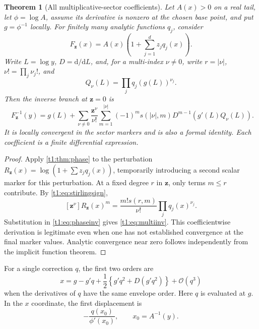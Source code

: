 \documentclass[11pt,openany]{book}
\numberwithin{equation}{chapter}
\theoremstyle{plain}
\newtheorem{theorem}{Theorem}[chapter]
\theoremstyle{definition}
\theoremstyle{remark}
\newcommand{\ddn}{\mathrm d}                  %
\newcommand{\OO}{\mathcal O}\newcommand{\bigO}{\mathcal O}
\newcommand{\coefA}[1]{\left[#1\right]}       %
\begin{document}
\begin{theorem}[All multiplicative-sector coefficients]
\label{t1:thm:multi}
Let $A(x)>0$ on a real tail, let $\phi=\log A$, assume its derivative is nonzero at the chosen base point, and put $g=\phi^{-1}$ locally. For finitely many analytic functions $q_j$, consider
\begin{equation}
 F_{\bm z}(x)=A(x)\left(1+\sum_{j=1}^d z_jq_j(x)\right).
 \label{t1:eq:multifamily}
\end{equation}
Write $L=\log y$, $D=\ddn/\ddn L$, and, for a multi-index $\nu\ne0$, write $r=|\nu|$, $\nu!=\prod_j\nu_j!$, and
\[
 Q_\nu(L)=\prod_j q_j(g(L))^{\nu_j}.
\]
Then the inverse branch at $\bm z=0$ is
\begin{equation}
 \boxed{\quad
 F_{\bm z}^{-1}(y)=g(L)+
 \sum_{\nu\ne0}\frac{\bm z^\nu}{\nu!}
 \sum_{m=1}^{|\nu|}(-1)^m s(|\nu|,m)
 D^{m-1}\!\left(g'(L)Q_\nu(L)\right).
 \quad}
 \label{t1:eq:multiinv}
\end{equation}
It is locally convergent in the sector markers and is also a formal identity. Each coefficient is a finite differential expression.
\end{theorem}
\begin{proof}
Apply \cref{t1:thm:phase} to the perturbation
$R_{\bm z}(x)=\log(1+\sum z_jq_j(x))$, temporarily introducing a second scalar marker for this perturbation. At a fixed degree $r$ in $\bm z$, only terms $m\le r$ contribute. By \eqref{t1:eq:stirlingsign},
\[
 \coefA{\bm z^\nu}R_{\bm z}(x)^m
 =\frac{m!s(r,m)}{\nu!}\prod_jq_j(x)^{\nu_j}.
\]
Substitution in \eqref{t1:eq:phaseinv} gives \eqref{t1:eq:multiinv}. This coefficientwise derivation is legitimate even when one has not established convergence at the final marker values. Analytic convergence near zero follows independently from the implicit function theorem.
\end{proof}

For a single correction $q$, the first two orders are
\begin{equation}
 x=g-g'q+\frac12\left\{g'q^2+D(g'q^2)\right\}+\OO(q^3)
 \label{t1:eq:firstmulti}
\end{equation}
when the derivatives of $q$ have the same envelope order. Here $q$ is evaluated at $g$. In the $x$ coordinate, the first displacement is
\begin{equation}
 -\frac{q(x_0)}{\phi'(x_0)},\qquad x_0=A^{-1}(y).
 \label{t1:eq:firstdisplacement}
\end{equation}
\end{document}
